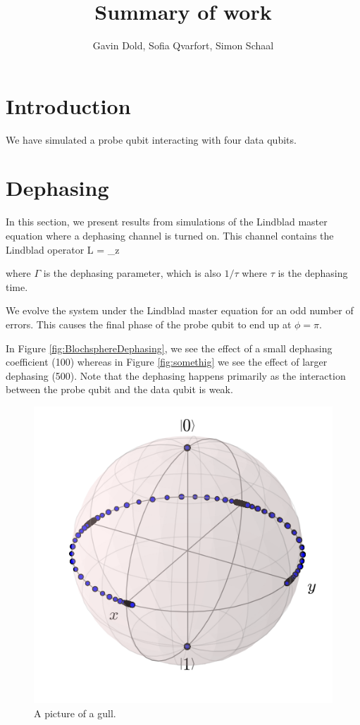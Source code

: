 


\title{Summary of work}
\author{Gavin Dold, Sofia Qvarfort, Simon Schaal}
\maketitle
\tableofcontents
\section{Introduction}
We have simulated a probe qubit interacting with four data qubits. 


\section{Dephasing}
In this section, we present results from simulations of the Lindblad master equation where a dephasing channel is turned on. This channel contains the Lindblad operator
\beq
L  = \sqrt{\Gamma} \sigma_z
\eeq

where $\Gamma$ is the dephasing parameter, which is also $1/\tau$ where $\tau$ is the dephasing time. 

We evolve the system under the Lindblad master equation for an odd number of errors. This causes the final phase of the probe qubit to end up at $\phi = \pi$. 

In Figure \ref{fig:BlochsphereDephasing}, we see the effect of a small dephasing coefficient (100) whereas in Figure \ref{fig:somethig} we see the effect of larger dephasing (500). Note that the dephasing happens primarily as the interaction between the probe qubit and the data qubit is weak. 



\begin{figure}[!ht]
  \caption{A picture of a gull.}
  \centering
    \includegraphics[width=\textwidth]{Figures/Circ_orbit_odd_no_dephasing.png}
\end{figure}




